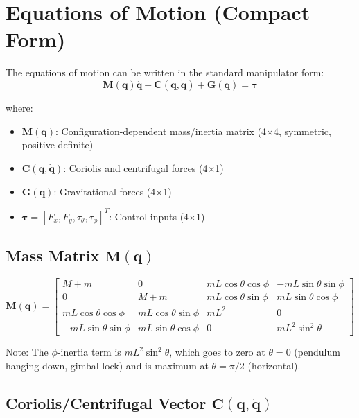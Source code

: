 \documentclass[12pt]{article}
\begin{document}
\section{Equations of Motion (Compact Form)}

The equations of motion can be written in the standard manipulator form:
\begin{equation}
    \mathbf{M}(\mathbf{q})\ddot{\mathbf{q}} + \mathbf{C}(\mathbf{q},\dot{\mathbf{q}}) + \mathbf{G}(\mathbf{q}) = \boldsymbol{\tau}
\end{equation}

where:
\begin{itemize}
    \item $\mathbf{M}(\mathbf{q})$: Configuration-dependent mass/inertia matrix (4×4, symmetric, positive definite)
    \item $\mathbf{C}(\mathbf{q},\dot{\mathbf{q}})$: Coriolis and centrifugal forces (4×1)
    \item $\mathbf{G}(\mathbf{q})$: Gravitational forces (4×1)
    \item $\boldsymbol{\tau} = [F_x, F_y, \tau_\theta, \tau_\phi]^T$: Control inputs (4×1)
\end{itemize}

\subsection{Mass Matrix $\mathbf{M}(\mathbf{q})$}

\begin{equation}
    \mathbf{M}(\mathbf{q}) = 
    \begin{bmatrix}
        M+m & 0 & mL\cos\theta\cos\phi & -mL\sin\theta\sin\phi \\
        0 & M+m & mL\cos\theta\sin\phi & mL\sin\theta\cos\phi \\
        mL\cos\theta\cos\phi & mL\cos\theta\sin\phi & mL^2 & 0 \\
        -mL\sin\theta\sin\phi & mL\sin\theta\cos\phi & 0 & mL^2\sin^2\theta
    \end{bmatrix}
\end{equation}

Note: The $\phi$-inertia term is $mL^2\sin^2\theta$, which goes to zero at $\theta = 0$ (pendulum hanging down, gimbal lock) and is maximum at $\theta = \pi/2$ (horizontal).

\subsection{Coriolis/Centrifugal Vector $\mathbf{C}(\mathbf{q},\dot{\mathbf{q}})$}
\end{document}
